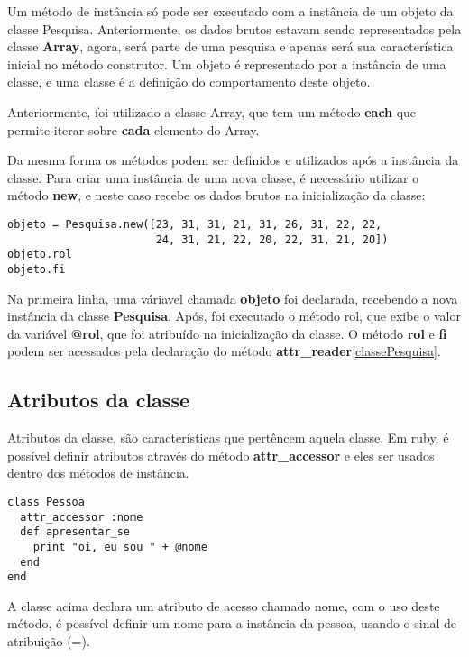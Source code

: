 \documentclass[12pt]{article}
\newcommand{\code}[1] {\textbf{#1}}
\begin{document}
Um método de instância só pode ser executado com a instância de um objeto da classe Pesquisa. Anteriormente, os dados brutos estavam sendo representados pela classe \code{Array}, agora, será parte de uma pesquisa e apenas será sua característica inicial no método construtor. Um objeto é representado por a instância de uma classe, e uma classe é a definição do comportamento deste objeto.

Anteriormente, foi utilizado a classe Array, que tem um método \code{each} que permite iterar sobre \code{cada} elemento do Array. 

Da mesma forma os métodos podem ser definidos e utilizados após a instância da classe. Para criar uma instância de uma nova classe, é necessário utilizar o método \code{new}, e neste caso recebe os dados brutos na inicialização da classe:

\begin{lstlisting}[caption=Criando uma classe]
objeto = Pesquisa.new([23, 31, 31, 21, 31, 26, 31, 22, 22, 
                       24, 31, 21, 22, 20, 22, 31, 21, 20])
objeto.rol
objeto.fi
\end{lstlisting}

Na primeira linha, uma váriavel chamada \code{objeto} foi declarada, recebendo a nova instância da classe \code{Pesquisa}. Após, foi executado o método rol, que exibe o valor da variável \code{@rol}, que foi atribuído na inicialização da classe. O método \code{rol} e \code{fi} podem ser acessados pela declaração do método \code{attr\_reader}\ref{classePesquisa}. 

\subsection{ Atributos da classe }

Atributos da classe, são características que pertêncem aquela classe. Em ruby, é possível definir atributos através do método \code{attr\_accessor} e eles ser usados dentro dos métodos de instância.

\begin{lstlisting}[caption=Criando uma classe com atributos]
class Pessoa
  attr_accessor :nome
  def apresentar_se 
    print "oi, eu sou " + @nome
  end
end
\end{lstlisting}

A classe acima declara um atributo de acesso chamado nome, com o uso deste método, é possível definir um nome para a instância da pessoa, usando o sinal de atribuição (=).
\end{document}

